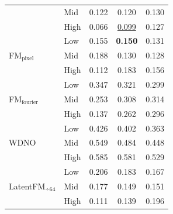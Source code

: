 \begin{table}[ht]
{\begin{tabular}{llccc}
 & Mid & 0.122 & 0.120 & 0.130 \\
 & High & 0.066 & \underline{0.099} & 0.127 \\
\midrule
\multirow{3}{*}{FM$_\text{pixel}$} & Low & 0.155 & \textbf{0.150} & 0.131 \\
 & Mid & 0.188 & 0.130 & 0.128 \\
 & High & 0.112 & 0.183 & 0.156 \\
\midrule
\multirow{3}{*}{FM$_\text{fourier}$} & Low & 0.347 & 0.321 & 0.299 \\
 & Mid & 0.253 & 0.308 & 0.314 \\
 & High & 0.137 & 0.262 & 0.296 \\
\midrule
\multirow{3}{*}{WDNO} & Low & 0.426 & 0.402 & 0.363 \\
 & Mid & 0.549 & 0.484 & 0.448 \\
 & High & 0.585 & 0.581 & 0.529 \\
\midrule
\multirow{3}{*}{LatentFM$_{\div 64}$} & Low & 0.206 & 0.183 & 0.167 \\
 & Mid & 0.177 & 0.149 & 0.151 \\
 & High & 0.111 & 0.139 & 0.196 \\
\bottomrule
\end{tabular}
}
\end{table}
